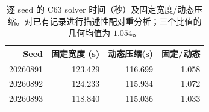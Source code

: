\begin{table}[t]
\centering
\caption{逐 seed 的 C63 solver 时间（秒）及固定宽度/动态压缩。对已有记录进行描述性配对重分析；三个比值的几何均值为 $1.054$。}
\label{tab:c63-solver-pairs}
\small
\begin{tabular}{@{}rrrr@{}}
\toprule
Seed & 固定宽度 (s) & 动态压缩(s) & 固定/动态 \\
\midrule
20260891 & 123.429 & 116.699 & 1.058 \\
20260892 & 124.233 & 115.934 & 1.072 \\
20260893 & 118.840 & 115.036 & 1.033 \\
\bottomrule
\end{tabular}
\end{table}
